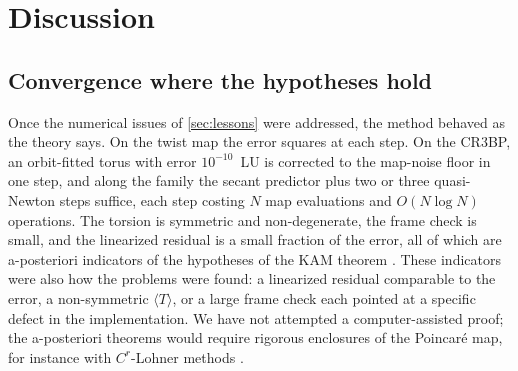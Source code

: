 \documentclass[11pt]{article}
\newcommand{\avg}[1]{\langle #1 \rangle}
\begin{document}
\section{Discussion}\label{sec:discussion}

\subsection{Convergence where the hypotheses hold}
Once the numerical issues of \cref{sec:lessons} were addressed, the method behaved as the theory
says. On the twist map the error squares at each step. On the CR3BP, an orbit-fitted torus with
error $10^{-10}$~LU is corrected to the map-noise floor in one step, and along the family the
secant predictor plus two or three quasi-Newton steps suffice, each step costing $N$ map
evaluations and $O(N\log N)$ operations. The torsion is symmetric and non-degenerate, the frame
check is small, and the linearized residual is a small fraction of the error, all of which are
a-posteriori indicators of the hypotheses of the KAM theorem
\cite{figueras2017rigorous}. These indicators were also how the problems were found: a
linearized residual comparable to the error, a non-symmetric $\avg{T}$, or a large frame check
each pointed at a specific defect in the implementation. We have not attempted a computer-assisted
proof; the a-posteriori theorems \cite{figueras2017rigorous,haro2016book} would require rigorous
enclosures of the Poincar\'e map, for instance with $C^r$-Lohner methods
\cite{wilczak2007lohner}.
\end{document}
